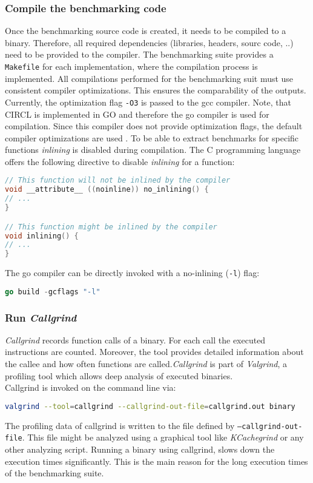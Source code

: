 \subsubsection{Compile the benchmarking code}
Once the benchmarking source code is created, it needs to be compiled to a binary. Therefore, all required dependencies (libraries, headers, sourc code, ..) need to be provided to the compiler. The benchmarking suite provides a \texttt{Makefile} for each implementation, where the compilation process is implemented.
All compilations performed for the benchmarking suit must use consistent compiler optimizations. This ensures the comparability of the outputs. Currently, the optimization flag \texttt{-O3} is passed to the gcc compiler. Note, that CIRCL is implemented in GO and therefore the go compiler is used for compilation. Since this compiler does not provide optimization flags, the default compiler optimizations are used \parencite{gowiki2020compiler}.
To be able to extract benchmarks for specific functions \textit{inlining} is disabled during compilation. The C programming language offers the following directive to disable \textit{inlining} for a function:
\begin{lstlisting}[language=C]
// This function will not be inlined by the compiler
void __attribute__ ((noinline)) no_inlining() {
// ...
}

// This function might be inlined by the compiler
void inlining() {
// ...
}
\end{lstlisting}
The go compiler can be directly invoked with a no-inlining (\texttt{-l}) flag:
\begin{lstlisting}[language=Go]
go build -gcflags "-l"
\end{lstlisting}

\subsubsection{Run \textit{Callgrind}}
\textit{Callgrind} records function calls of a binary. For each call the executed instructions are counted. Moreover, the tool provides detailed information about the callee and how often functions are called.\textit{Callgrind} is part of \textit{Valgrind}, a profiling tool which allows deep analysis of executed binaries.\\
Callgrind is invoked on the command line via:
\begin{lstlisting}[language=Bash]
valgrind --tool=callgrind --callgrind-out-file=callgrind.out binary
\end{lstlisting}
The profiling data of callgrind is written to the file defined by \texttt{--callgrind-out-file}. This file might be analyzed using a graphical tool like \textit{KCachegrind} or any other analyzing script.
Running a binary using callgrind, slows down the execution times significantly. This is the main reason for the long execution times of the benchmarking suite. 

